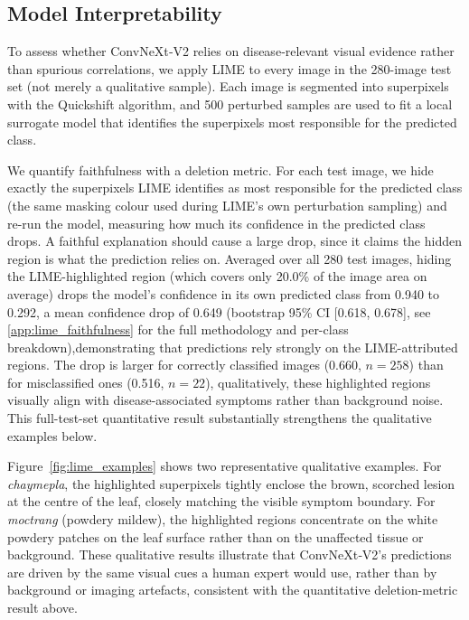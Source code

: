 \subsection{Model Interpretability}
\label{subsec:interpretability}

To assess whether ConvNeXt‑V2 relies on disease‑relevant visual evidence rather than spurious correlations, we apply LIME \citep{ribeiro2016why} to every image in the 280-image test set (not merely a qualitative sample). Each image is segmented into superpixels with the Quickshift algorithm, and 500 perturbed samples are used to fit a local surrogate model that identifies the superpixels most responsible for the predicted class.

We quantify faithfulness with a deletion metric. For each test image, we hide exactly the superpixels LIME identifies as most responsible for the predicted class (the same masking colour used during LIME's own perturbation sampling) and re-run the model, measuring how much its confidence in the predicted class drops. A faithful explanation should cause a large drop, since it claims the hidden region is what the prediction relies on. Averaged over all 280 test images, hiding the LIME-highlighted region (which covers only 20.0\% of the image area on average) drops the model's confidence in its own predicted class from 0.940 to 0.292, a mean confidence drop of 0.649 (bootstrap 95\% CI [0.618, 0.678], see \ref{app:lime_faithfulness} for the full methodology and per-class breakdown),demonstrating that predictions rely strongly on the LIME-attributed regions. The drop is larger for correctly classified images (0.660, $n=258$) than for misclassified ones (0.516, $n=22$), qualitatively, these highlighted regions visually align with disease-associated symptoms rather than background noise. This full-test-set quantitative result substantially strengthens the qualitative examples below.

Figure~\ref{fig:lime_examples} shows two representative qualitative examples. For \textit{chaymepla}, the highlighted superpixels tightly enclose the brown, scorched lesion at the centre of the leaf, closely matching the visible symptom boundary. For \textit{moctrang} (powdery mildew), the highlighted regions concentrate on the white powdery patches on the leaf surface rather than on the unaffected tissue or background. These qualitative results illustrate that ConvNeXt‑V2's predictions are driven by the same visual cues a human expert would use, rather than by background or imaging artefacts, consistent with the quantitative deletion-metric result above.


